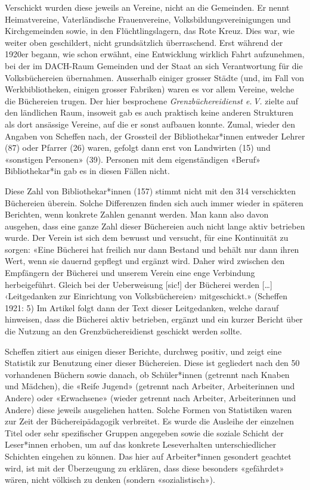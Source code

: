 \documentclass[a4paper,
fontsize=11pt,
oneside,
numbers=noperiodatend,
parskip=half-,
bibliography=totoc,
final
]{scrartcl}
\begin{document}
Verschickt wurden diese jeweils an Vereine, nicht an die Gemeinden. Er
nennt Heimatvereine, Vaterländische Frauenvereine,
Volksbildungsvereinigungen und Kirchgemeinden sowie, in den
Flüchtlingslagern, das Rote Kreuz. Dies war, wie weiter oben
geschildert, nicht grundsätzlich überraschend. Erst während der 1920er
begann, wie schon erwähnt, eine Entwicklung wirklich Fahrt aufzunehmen,
bei der im DACH-Raum Gemeinden und der Staat an sich Verantwortung für
die Volksbüchereien übernahmen. Ausserhalb einiger grosser Städte (und,
im Fall von Werkbibliotheken, einigen grosser Fabriken) waren es vor
allem Vereine, welche die Büchereien trugen. Der hier besprochene
\emph{Grenzbüchereidienst e.\,V.} zielte auf den ländlichen Raum, insoweit
gab es auch praktisch keine anderen Strukturen als dort ansässige
Vereine, auf die er sonst aufbauen konnte. Zumal, wieder den Angaben von
Scheffen nach, der Grossteil der Bibliothekar*innen entweder Lehrer (87)
oder Pfarrer (26) waren, gefolgt dann erst von Landwirten (15) und
«sonstigen Personen» (39). Personen mit dem eigenständigen «Beruf»
Bibliothekar*in gab es in diesen Fällen nicht.

Diese Zahl von Bibliothekar*innen (157) stimmt nicht mit den 314
verschickten Büchereien überein. Solche Differenzen finden sich auch
immer wieder in späteren Berichten, wenn konkrete Zahlen genannt werden.
Man kann also davon ausgehen, dass eine ganze Zahl dieser Büchereien
auch nicht lange aktiv betrieben wurde. Der Verein ist sich dem bewusst
und versucht, für eine Kontinuität zu sorgen: «Eine Bücherei hat
freilich nur dann Bestand und behält nur dann ihren Wert, wenn sie
dauernd gepflegt und ergänzt wird. Daher wird zwischen den Empfängern
der Bücherei und unserem Verein eine enge Verbindung herbeigeführt.
Gleich bei der Ueberweisung {[}sic!{]} der Bücherei werden {[}\ldots{]}
‹Leitgedanken zur Einrichtung von Volksbüchereien› mitgeschickt.»
(Scheffen 1921: 5) Im Artikel folgt dann der Text dieser Leitgedanken,
welche darauf hinweisen, dass die Bücherei aktiv betrieben, ergänzt und
ein kurzer Bericht über die Nutzung an den Grenzbüchereidienst geschickt
werden sollte.

Scheffen zitiert aus einigen dieser Berichte, durchweg positiv, und
zeigt eine Statistik zur Benutzung einer dieser Büchereien. Diese ist
gegliedert nach den 50 vorhandenen Büchern sowie danach, ob
Schüler*innen (getrennt nach Knaben und Mädchen), die «Reife Jugend»
(getrennt nach Arbeiter, Arbeiterinnen und Andere) oder «Erwachsene»
(wieder getrennt nach Arbeiter, Arbeiterinnen und Andere) diese jeweils
ausgeliehen hatten. Solche Formen von Statistiken waren zur Zeit der
Büchereipädagogik verbreitet. Es wurde die Ausleihe der einzelnen Titel
oder sehr spezifischer Gruppen angegeben sowie die soziale Schicht der
Leser*innen erhoben, um auf das konkrete Leseverhalten unterschiedlicher
Schichten eingehen zu können. Das hier auf Arbeiter*innen gesondert
geachtet wird, ist mit der Überzeugung zu erklären, dass diese besonders
«gefährdet» wären, nicht völkisch zu denken (sondern «sozialistisch»).
\end{document}
